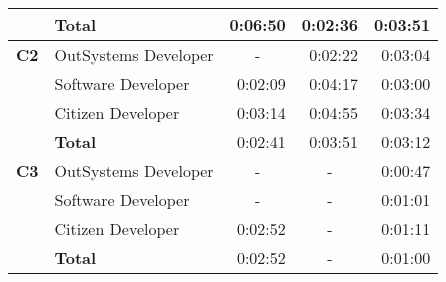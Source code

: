 \begin{table}[tb]
\begin{tabular}{llrcr}
                            & \textbf{Total}       & 0:06:50                                                           & \multicolumn{1}{r}{0:02:36}                                             & 0:03:51                                                       \\ \hline
  \textbf{C2}               & OutSystems Developer & \multicolumn{1}{c}{-}                                             & \multicolumn{1}{r}{0:02:22}                                             & 0:03:04                                                       \\
                            & Software Developer   & 0:02:09                                                           & \multicolumn{1}{r}{0:04:17}                                             & 0:03:00                                                       \\
                            & Citizen Developer    & 0:03:14                                                           & \multicolumn{1}{r}{0:04:55}                                             & 0:03:34                                                       \\
                            & \textbf{Total}       & 0:02:41                                                           & \multicolumn{1}{r}{0:03:51}                                             & 0:03:12                                                       \\ \hline
  \textbf{C3}               & OutSystems Developer & \multicolumn{1}{c}{-}                                             & -                                                                       & 0:00:47                                                       \\
                            & Software Developer   & \multicolumn{1}{c}{-}                                             & -                                                                       & 0:01:01                                                       \\
                            & Citizen Developer    & 0:02:52                                                           & -                                                                       & 0:01:11                                                       \\
                            & \textbf{Total}       & 0:02:52                                                           & -                                                                       & 0:01:00                                                       \\ \hline

\end{tabular}
\end{table}

